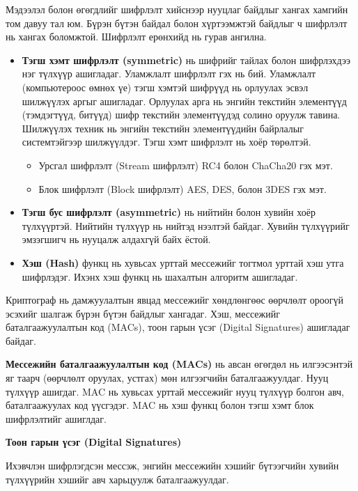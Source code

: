 Мэдээлэл болон өгөгдлийг шифрлэлт хийснээр нууцлаг байдлыг хангах хамгийн том давуу тал юм. Бүрэн бүтэн байдал болон хүртээмжтэй байдлыг ч шифрлэлт нь хангах боломжтой.
Шифрлэлт ерөнхийд нь гурав ангилна.
\begin{itemize}
    \item \textbf{Тэгш хэмт шифрлэлт (symmetric)} нь шифрийг тайлах болон шифрлэхдээ нэг түлхүүр ашигладаг. Уламжлалт шифрлэлт гэх нь бий. Уламжлалт (компьютероос өмнөх үе) тэгш хэмтэй шифрүүд нь орлуулах эсвэл шилжүүлэх аргыг ашигладаг. Орлуулах арга нь энгийн текстийн элементүүд (тэмдэгтүүд, битүүд) шифр текстийн элементүүдэд солино оруулж тавина. Шилжүүлэх техник нь энгийн текстийн элементүүдийн байрлалыг системтэйгээр шилжүүлдэг. 
    Тэгш хэмт шифрлэлт нь хоёр төрөлтэй.
    \begin{itemize}
        \item Урсгал шифрлэлт (Stream шифрлэлт) RC4 болон ChaCha20 гэх мэт.
        \item Блок шифрлэлт (Block шифрлэлт) AES, DES, болон 3DES гэх мэт.
    \end{itemize}
    \item \textbf{Тэгш бус шифрлэлт (asymmetric)} нь нийтийн болон хувийн хоёр түлхүүртэй. Нийтийн түлхүүр нь нийтэд нээлтэй байдаг. Хувийн түлхүүрийг эмзэгшигч нь нууцалж алдахгүй байх ёстой. 
    \item \textbf{Хэш (Hash)} функц нь хувьсах урттай мессежийг тогтмол урттай хэш утга шифрлэдэг. Ихэнх хэш функц нь шахалтын алгоритм ашигладаг.
\end{itemize}

Криптограф нь дамжуулалтын явцад мессежийг хөндлөнгөөс өөрчлөлт ороогүй эсэхийг шалгаж бүрэн бүтэн байдлыг хангадаг. Хэш, мессежийг баталгаажуулалтын код (MACs), тоон гарын үсэг (Digital Signatures) ашигладаг байдаг.

\textbf{Мессежийн баталгаажуулалтын код (MACs)} нь авсан өгөгдөл нь илгээсэнтэй яг таарч (өөрчлөлт оруулах, устгах) мөн илгээгчийн баталгаажуулдаг.
Нууц түлхүүр ашигдаг. MAC нь хувьсах урттай мессежийг нууц түлхүүр болгон авч, баталгаажуулах код үүсгэдэг. MAC нь хэш функц болон тэгш хэмт блок шифрлэлтийг ашиглдаг.

\textbf{Тоон гарын үсэг (Digital Signatures)}

Ихэвчлэн шифрлэгдсэн мессэж, энгийн мессежийн хэшийг бүтээгчийн хувийн түлхүүрийн хэшийг авч харьцуулж баталгаажуулдаг.


